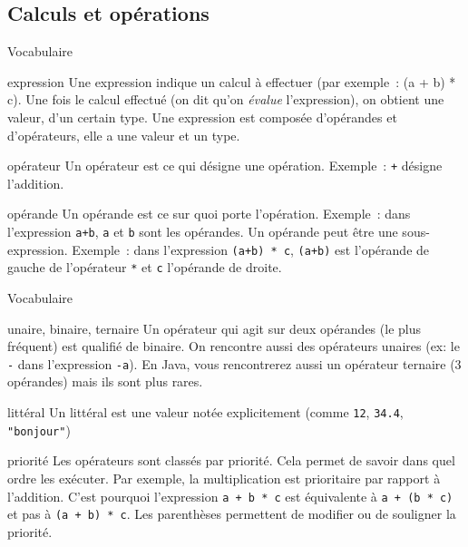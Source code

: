 \begin{hideedit}
\subsection{Calculs et opérations}
\begin{frame}[fragile]{Vocabulaire}
  \begin{block}{expression}
        Une expression indique un calcul à effectuer
        (par exemple~: (a + b) * c).
        Une fois le calcul effectué
        (on dit qu’on \emph{évalue} l’expression),
        on obtient une valeur, d’un certain type.
        Une expression est composée d’opérandes et d’opérateurs,
        elle a une valeur et un type.
  \end{block}
  \pause
  \begin{block}{opérateur}
        Un opérateur est ce qui désigne une opération.
        Exemple~: \Verb_+_ désigne l’addition.
  \end{block}
  \pause
  \begin{block}{opérande}
        Un opérande est ce sur quoi porte l’opération.
        Exemple~: dans l’expression \Verb_a+b_,
        \Verb_a_ et \Verb_b_ sont les opérandes.
        Un opérande peut être une sous-expression.
        Exemple~: dans l’expression \Verb_(a+b) * c_,
        \Verb_(a+b)_ est l’opérande
        de gauche de l’opérateur \Verb_*_ et \Verb_c_ l'opérande de
        droite.
  \end{block}
\end{frame}
\begin{frame}[fragile]{Vocabulaire}
  \begin{block}{unaire, binaire, ternaire}
        Un opérateur qui agit sur deux opérandes (le plus fréquent)
        est qualifié de binaire.
        On rencontre aussi des opérateurs unaires (ex: le \Verb_-_
        dans l’expression \Verb_-a_).
        En Java, vous rencontrerez aussi un opérateur ternaire (3 opérandes)
        mais ils sont plus rares.
  \end{block}
  \pause
  \begin{block}{littéral}
        Un littéral est une valeur notée explicitement
        (comme \Verb_12_, \Verb_34.4_, \Verb_"bonjour"_)
  \end{block}
  \pause
  \begin{block}{priorité}
        Les opérateurs sont classés par priorité.  Cela permet de savoir
        dans quel ordre les exécuter.  Par exemple, la multiplication
        est prioritaire par rapport à l'addition.  C’est pourquoi
        l'expression \Verb_a + b * c_ est équivalente à
        \Verb_a + (b * c)_ et pas à \Verb_(a + b) * c_.
        Les parenthèses permettent
        de modifier ou de souligner la priorité.
  \end{block}
\end{frame}


\end{hideedit}
